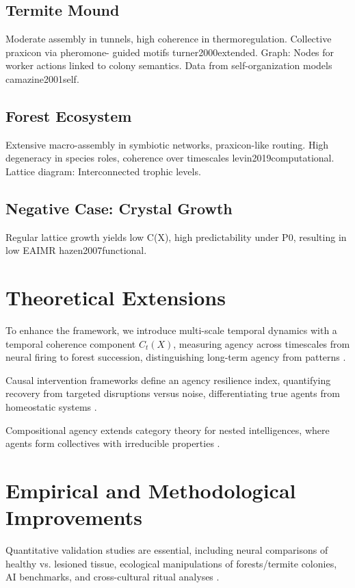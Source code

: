 \documentclass{article}
\begin{document}
\subsection{Termite Mound}
Moderate assembly in tunnels, high coherence in thermoregulation.
Collective praxicon via pheromone-
guided motifs {turner2000extended}. Graph: Nodes for worker actions linked to colony semantics. Data from self-organization
models {camazine2001self}.

\subsection{Forest Ecosystem}
Extensive macro-assembly in symbiotic networks, praxicon-like routing. High degeneracy in species roles,
coherence over timescales {levin2019computational}. Lattice diagram: Interconnected trophic levels.

\subsection{Negative Case: Crystal Growth}
Regular lattice growth yields low C(X), high predictability under P0, resulting in low EAIMR {hazen2007functional}.

\section{Theoretical Extensions}
\label{sec:theoretical_extensions}

To enhance the framework, we introduce multi-scale temporal dynamics with a temporal coherence component \(C_t(X)\), measuring agency across timescales from neural firing to forest succession, distinguishing long-term agency from patterns \citep{levin2019computational}.

Causal intervention frameworks define an agency resilience index, quantifying recovery from targeted disruptions versus noise, differentiating true agents from homeostatic systems \citep{barandiaran2009defining}.

Compositional agency extends category theory for nested intelligences, where agents form collectives with irreducible properties \citep{ehresmann2021}.

\section{Empirical and Methodological Improvements}
\label{sec:empirical}

Quantitative validation studies are essential, including neural comparisons of healthy vs. lesioned tissue, ecological manipulations of forests/termite colonies, AI benchmarks, and cross-cultural ritual analyses \citep{pastra2011praxicon}.
\end{document}
